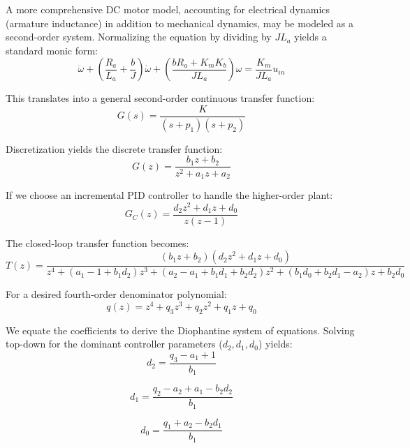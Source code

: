 A more comprehensive DC motor model, accounting for electrical dynamics (armature inductance) in addition to mechanical dynamics, may be modeled as a second-order system. Normalizing the equation by dividing by $J L_a$ yields a standard monic form:
\begin{equation}
	\ddot{\omega} + \left(\frac{R_a}{L_a} + \frac{b}{J}\right)\dot{\omega} + \left(\frac{b R_a + K_m K_b}{J L_a}\right)\omega = \frac{K_m}{J L_a} u_{in}
\end{equation}

This translates into a general second-order continuous transfer function:
\begin{equation}
	G(s) = \frac{K}{(s + p_1)(s + p_2)}
\end{equation}

Discretization yields the discrete transfer function:
\begin{equation}
	G(z) = \frac{b_1 z + b_2}{z^2 + a_1 z + a_2}
\end{equation}

If we choose an incremental PID controller to handle the higher-order plant:
\begin{equation}
	G_C(z) = \frac{d_2 z^2 + d_1 z + d_0}{z(z - 1)}
\end{equation}

The closed-loop transfer function becomes:
\begin{equation}
	T(z) = \frac{(b_1 z + b_2)(d_2 z^2 + d_1 z + d_0)}{z^4 + (a_1 - 1 + b_1 d_2)z^3 + (a_2 - a_1 + b_1 d_1 + b_2 d_2)z^2 + (b_1 d_0 + b_2 d_1 - a_2)z + b_2 d_0}
\end{equation}

For a desired fourth-order denominator polynomial:
\begin{equation}
	q(z) = z^4 + q_3 z^3 + q_2 z^2 + q_1 z + q_0
\end{equation}

We equate the coefficients to derive the Diophantine system of equations. Solving top-down for the dominant controller parameters ($d_2, d_1, d_0$) yields:
\begin{equation}
	d_2 = \frac{q_3 - a_1 + 1}{b_1}
\end{equation}

\begin{equation}
	d_1 = \frac{q_2 - a_2 + a_1 - b_2 d_2}{b_1}
\end{equation}

\begin{equation}
	d_0 = \frac{q_1 + a_2 - b_2 d_1}{b_1}
\end{equation}
